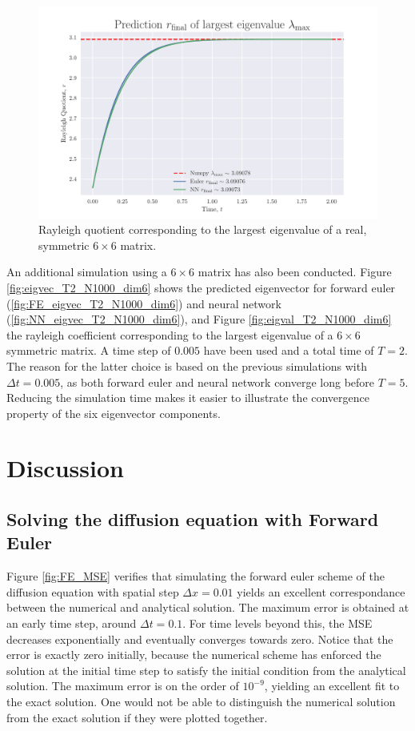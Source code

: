 \documentclass[12pt]{extarticle}
\begin{document}
\begin{figure}[h]
	\centering
	\includegraphics[scale=0.6]{../output/plots/eigval_T2_N1000_dim6.pdf}
	\caption{Rayleigh quotient corresponding to the largest eigenvalue of a real, symmetric $6\times 6$ matrix.}
\end{figure}

An additional simulation using a $6\times 6$ matrix has also been conducted. Figure \ref{fig:eigvec_T2_N1000_dim6} shows the predicted eigenvector for forward euler (\ref{fig:FE_eigvec_T2_N1000_dim6}) and neural network (\ref{fig:NN_eigvec_T2_N1000_dim6}), and Figure \ref{fig:eigval_T2_N1000_dim6} the rayleigh coefficient corresponding to the largest eigenvalue of a $6\times 6$ symmetric matrix. A time step of $0.005$ have been used and a total time of $T=2$. The reason for the latter choice is based on the previous simulations with $\Delta t=0.005$, as both forward euler and neural network converge long before $T=5$. Reducing the simulation time makes it easier to illustrate the convergence property of the six eigenvector components.
 
 
\clearpage
\section{Discussion}

\subsection{Solving the diffusion equation with Forward Euler}
Figure \ref{fig:FE_MSE} verifies that simulating the forward euler scheme of the diffusion equation with spatial step $\Delta x = 0.01$ yields an excellent correspondance between the numerical and analytical solution. The maximum error is obtained at an early time step, around $\Delta t = 0.1$. For time levels beyond this, the MSE decreases exponentially and eventually converges towards zero. Notice that the error is exactly zero initially, because the numerical scheme has enforced the solution at the initial time step to satisfy the initial condition from the analytical solution. The maximum error is on the order of $10^{-9}$, yielding an excellent fit to the exact solution. One would not be able to distinguish the numerical solution from the exact solution if they were plotted together.
\end{document}
